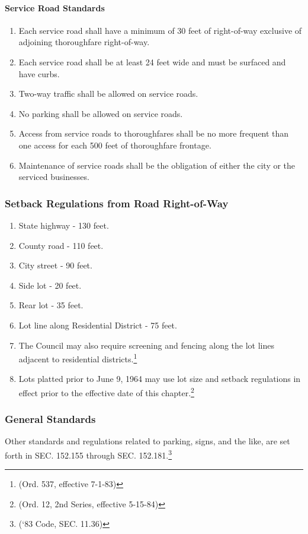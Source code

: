 \paragraph{Service Road Standards}
\begin{enumerate}[{\indent}1)]
    \item Each service road shall have a minimum of 30 feet of right-of-way exclusive of adjoining thoroughfare right-of-way.
    \item Each service road shall be at least 24 feet wide and must be surfaced and have curbs.
    \item Two-way traffic shall be allowed on service roads.
    \item No parking shall be allowed on service roads.
    \item Access from service roads to thoroughfares shall be no more frequent than one access for each 500 feet of thoroughfare frontage.
    \item Maintenance of service roads shall be the obligation of either the city or the serviced businesses.
\end{enumerate}
\subsubsection{Setback Regulations from Road Right-of-Way}
\begin{enumerate}[{\indent}a)]
    \item State highway - 130 feet.
    \item County road - 110 feet.
    \item City street - 90 feet.
    \item Side lot - 20 feet.
    \item Rear lot - 35 feet.
    \item Lot line along Residential District - 75 feet.
    \item The Council may also require screening and fencing along the lot lines adjacent to residential districts.\footnote{(Ord. 537, effective 7-1-83)}
    \item Lots platted prior to June 9, 1964 may use lot size and setback regulations in effect prior to the effective date of this chapter.\footnote{(Ord. 12, 2nd Series, effective 5-15-84)}
\end{enumerate}
\subsubsection{General Standards}
Other standards and regulations related to parking, signs, and the like, are set forth in SEC. 152.155 through SEC. 152.181.\footnote{(‘83 Code, SEC. 11.36)}

